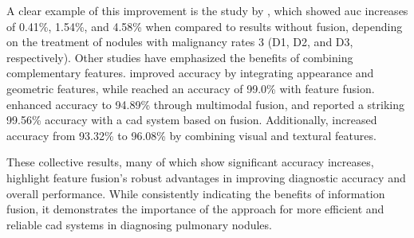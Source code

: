 A clear example of this improvement is the study by \textcite{xie_fusing_2018}, which showed \ac{auc} increases of 0.41\%, 1.54\%, and 4.58\% when compared to results without fusion, depending on the treatment of nodules with malignancy rates 3 (D1, D2, and D3, respectively).
Other studies have emphasized the benefits of combining complementary features. \textcite{shaffie_computer-assisted_2022} improved accuracy by integrating appearance and geometric features, while \textcite{saba_lung_2019} reached an accuracy of 99.0\% with feature fusion. \textcite{yuan_multi-modal_2023} enhanced accuracy to 94.89\% through multimodal fusion, and \textcite{liu_artificial_2022} reported a striking 99.56\% accuracy with a \ac{cad} system based on fusion. Additionally, \textcite{iqbal_fusion_2023} increased accuracy from 93.32\% to 96.08\% by combining visual and textural features.

These collective results, many of which show significant accuracy increases, highlight feature fusion's robust advantages in improving diagnostic accuracy and overall performance. While consistently indicating the benefits of information fusion, it demonstrates the importance of the approach for more efficient and reliable \ac{cad} systems in diagnosing pulmonary nodules.